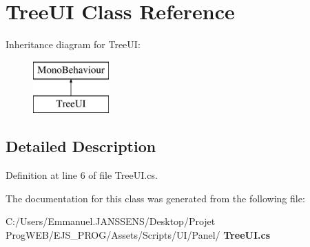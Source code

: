 \section{Tree\+UI Class Reference}
\label{class_tree_u_i}
Inheritance diagram for Tree\+UI\+:\begin{figure}[H]
\begin{center}
\leavevmode
\includegraphics[height=2.000000cm]{class_tree_u_i}
\end{center}
\end{figure}


\subsection{Detailed Description}


Definition at line 6 of file Tree\+U\+I.\+cs.



The documentation for this class was generated from the following file\+:\begin{DoxyCompactItemize}
\item 
C\+:/\+Users/\+Emmanuel.\+J\+A\+N\+S\+S\+E\+N\+S/\+Desktop/\+Projet Prog\+W\+E\+B/\+E\+J\+S\+\_\+\+P\+R\+O\+G/\+Assets/\+Scripts/\+U\+I/\+Panel/\textbf{ Tree\+U\+I.\+cs}\end{DoxyCompactItemize}
